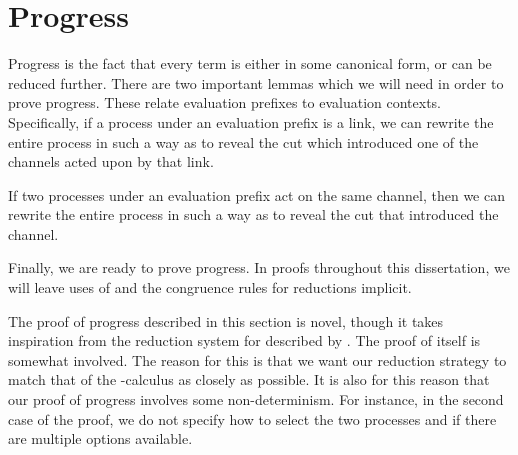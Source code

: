 \section{Progress}\label{sec:cp-progress}
Progress is the fact that every term is either in some canonical form, or can be
reduced further.
%
There are two important lemmas which we will need in order to prove progress.
These relate evaluation prefixes to evaluation contexts.
%
Specifically, if a process under an evaluation prefix is a link, we can rewrite
the entire process in such a way as to reveal the cut which introduced one of
the channels acted upon by that link.

If two processes under an evaluation prefix act on the same channel, then we
can rewrite the entire process in such a way as to reveal the cut that 
introduced the channel. 


Finally, we are ready to prove progress.
In proofs throughout this dissertation, we will leave uses of
\cpRedGammaEquiv and the congruence rules for reductions implicit. 

The proof of progress described in this section is novel, though it takes
inspiration from the reduction system for \cp described by . 
The proof of itself is somewhat involved. The reason for
this is that we want our reduction strategy to match that of the
\textpi-calculus as closely as possible.
It is also for this reason that our proof of progress involves some
non-determinism. For instance, in the second case of the proof, we do not
specify how to select the two processes  and  if there are
multiple options available.

